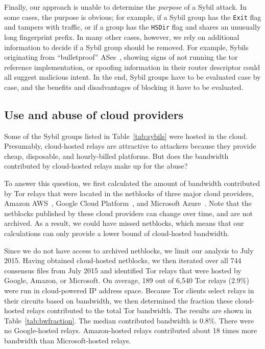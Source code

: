 Finally, our approach is unable to determine the \emph{purpose} of a Sybil
attack.  In some cases, the purpose is obvious; for example, if a Sybil group
has the \texttt{Exit} flag and tampers with traffic, or if a group has the
\texttt{HSDir} flag and shares an unusually long fingerprint prefix.  In many
other cases, however, we rely on additional information to decide if a Sybil
group should be removed.  For example, Sybils originating from ``bulletproof''
ASes~\cite{Konte2015a}, showing signs of not running the tor reference
implementation, or spoofing information in their router descriptor could all
suggest malicious intent.  In the end, Sybil groups have to be evaluated case
by case, and the benefits and disadvantages of blocking it have to be evaluated.


\subsection{Use and abuse of cloud providers}
\label{sec:cloud}
Some of the Sybil groups listed in Table~\ref{tab:sybils} were hosted in the
cloud.  Presumably, cloud-hosted relays are attractive to attackers because they
provide cheap, disposable, and hourly-billed platforms.  But does the bandwidth
contributed by cloud-hosted relays make up for the abuse?

To answer this question, we first calculated the amount of bandwidth contributed
by Tor relays that were located in the netblocks of three major cloud providers,
Amazon AWS~\cite{amazonaws}, Google Cloud Platform~\cite{googlecloud}, and
Microsoft Azure~\cite{azure}.  Note that the netblocks published by these cloud
providers can change over time, and are not archived.  As a result, we could
have missed netblocks, which means that our calculations can only provide a
lower bound of cloud-hosted bandwidth.

Since we do not have access to archived netblocks, we limit our analysis to
July 2015.  Having obtained cloud-hosted netblocks, we then iterated over all
744 consensus files from July 2015 and identified Tor relays that were hosted
by Google, Amazon, or Microsoft.  On average, 189 out of 6,540 Tor relays
(2.9\%) were run in cloud-powered IP address space.  Because Tor
clients select relays in their circuits based on bandwidth, we then determined
the fraction these cloud-hosted relays contributed to the total Tor bandwidth.
The results are shown in Table~\ref{tab:bwfraction}.  The median contributed
bandwidth is 0.8\%.  There were no Google-hosted relays.  Amazon-hosted relays
contributed about 18 times more bandwidth than Microsoft-hosted relays.

